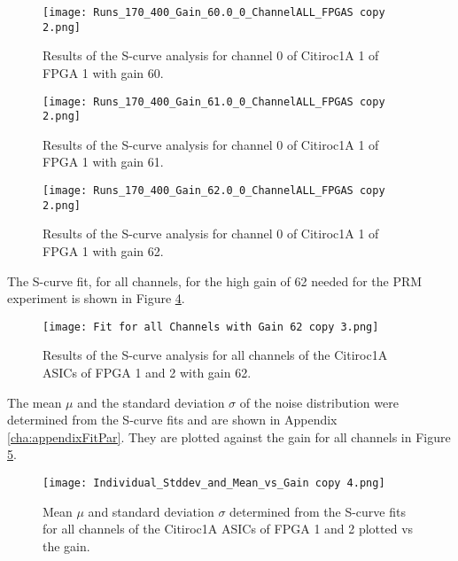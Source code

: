     \begin{figure}[H]
        \centering
        \texttt{[image: Runs\_170\_400\_Gain\_60.0\_0\_ChannelALL\_FPGAS copy 2.png]}
        \caption{Results of the S-curve analysis for channel 0 of Citiroc1A 1 of FPGA 1 with gain 60.}
        \label{fig:S_curve_60}
    \end{figure}
    \begin{figure}[H]
        \centering
        \texttt{[image: Runs\_170\_400\_Gain\_61.0\_0\_ChannelALL\_FPGAS copy 2.png]}
        \caption{Results of the S-curve analysis for channel 0 of Citiroc1A 1 of FPGA 1 with gain 61.}
        \label{fig:S_curve_61}
    \end{figure}
    \begin{figure}[H]
        \centering
        \texttt{[image: Runs\_170\_400\_Gain\_62.0\_0\_ChannelALL\_FPGAS copy 2.png]}
        \caption{Results of the S-curve analysis for channel 0 of Citiroc1A 1 of FPGA 1 with gain 62.}
        \label{fig:S_curve_62}
    \end{figure}
    The S-curve fit, for all channels, for the high gain of 62 needed for the PRM experiment is shown in Figure \ref{fig:S_curve_62_ALL}. 
    
    \begin{figure}[H]
        \centering
        \texttt{[image: Fit for all Channels with Gain 62 copy 3.png]}
        \caption{Results of the S-curve analysis for all channels of the Citiroc1A ASICs of FPGA 1 and 2 with gain 62.}
        \label{fig:S_curve_62_ALL}
    \end{figure}
    The mean $\mu$ and the standard deviation $\sigma$ of the noise distribution were determined from the S-curve fits and are shown in Appendix \ref{cha:appendixFitPar}.
    They are plotted against the gain for all channels in Figure \ref{fig:Mean vs gain}.
    \begin{figure}[H]
        \centering
        \texttt{[image: Individual\_Stddev\_and\_Mean\_vs\_Gain copy 4.png]}
        \caption{Mean $\mu$ and standard deviation $\sigma$ determined from the S-curve fits for all channels of the Citiroc1A ASICs of FPGA 1 and 2 plotted vs the gain.}
        \label{fig:Mean vs gain}
    \end{figure}
    
